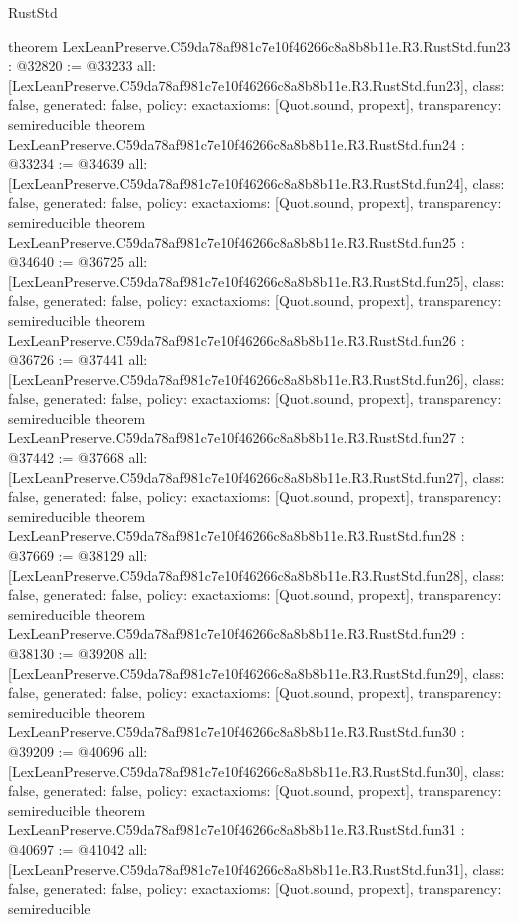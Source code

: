 \begin{lexlean}{RustStd}
\begin{coremodule}
{}
theorem LexLeanPreserve.C59da78af981c7e10f46266c8a8b8b11e.R3.RustStd.fun23 : @32820 := @33233 {
  all: [LexLeanPreserve.C59da78af981c7e10f46266c8a8b8b11e.R3.RustStd.fun23],
  class: false,
  generated: false,
  policy: exact{axioms: [Quot.sound, propext]},
  transparency: semireducible
}
theorem LexLeanPreserve.C59da78af981c7e10f46266c8a8b8b11e.R3.RustStd.fun24 : @33234 := @34639 {
  all: [LexLeanPreserve.C59da78af981c7e10f46266c8a8b8b11e.R3.RustStd.fun24],
  class: false,
  generated: false,
  policy: exact{axioms: [Quot.sound, propext]},
  transparency: semireducible
}
theorem LexLeanPreserve.C59da78af981c7e10f46266c8a8b8b11e.R3.RustStd.fun25 : @34640 := @36725 {
  all: [LexLeanPreserve.C59da78af981c7e10f46266c8a8b8b11e.R3.RustStd.fun25],
  class: false,
  generated: false,
  policy: exact{axioms: [Quot.sound, propext]},
  transparency: semireducible
}
theorem LexLeanPreserve.C59da78af981c7e10f46266c8a8b8b11e.R3.RustStd.fun26 : @36726 := @37441 {
  all: [LexLeanPreserve.C59da78af981c7e10f46266c8a8b8b11e.R3.RustStd.fun26],
  class: false,
  generated: false,
  policy: exact{axioms: [Quot.sound, propext]},
  transparency: semireducible
}
theorem LexLeanPreserve.C59da78af981c7e10f46266c8a8b8b11e.R3.RustStd.fun27 : @37442 := @37668 {
  all: [LexLeanPreserve.C59da78af981c7e10f46266c8a8b8b11e.R3.RustStd.fun27],
  class: false,
  generated: false,
  policy: exact{axioms: [Quot.sound, propext]},
  transparency: semireducible
}
theorem LexLeanPreserve.C59da78af981c7e10f46266c8a8b8b11e.R3.RustStd.fun28 : @37669 := @38129 {
  all: [LexLeanPreserve.C59da78af981c7e10f46266c8a8b8b11e.R3.RustStd.fun28],
  class: false,
  generated: false,
  policy: exact{axioms: [Quot.sound, propext]},
  transparency: semireducible
}
theorem LexLeanPreserve.C59da78af981c7e10f46266c8a8b8b11e.R3.RustStd.fun29 : @38130 := @39208 {
  all: [LexLeanPreserve.C59da78af981c7e10f46266c8a8b8b11e.R3.RustStd.fun29],
  class: false,
  generated: false,
  policy: exact{axioms: [Quot.sound, propext]},
  transparency: semireducible
}
theorem LexLeanPreserve.C59da78af981c7e10f46266c8a8b8b11e.R3.RustStd.fun30 : @39209 := @40696 {
  all: [LexLeanPreserve.C59da78af981c7e10f46266c8a8b8b11e.R3.RustStd.fun30],
  class: false,
  generated: false,
  policy: exact{axioms: [Quot.sound, propext]},
  transparency: semireducible
}
theorem LexLeanPreserve.C59da78af981c7e10f46266c8a8b8b11e.R3.RustStd.fun31 : @40697 := @41042 {
  all: [LexLeanPreserve.C59da78af981c7e10f46266c8a8b8b11e.R3.RustStd.fun31],
  class: false,
  generated: false,
  policy: exact{axioms: [Quot.sound, propext]},
  transparency: semireducible
}
\end{coremodule}
\end{lexlean}
